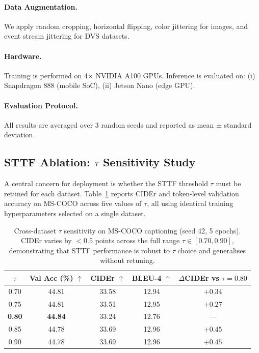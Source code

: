 \documentclass{article}
\begin{document}
\paragraph{Data Augmentation.}
We apply random cropping, horizontal flipping, color jittering for images,
and event stream jittering for DVS datasets.
\paragraph{Hardware.}
Training is performed on 4× NVIDIA A100 GPUs.
Inference is evaluated on:
(i) Snapdragon 888 (mobile SoC),
(ii) Jetson Nano (edge GPU).

\paragraph{Evaluation Protocol.}
All results are averaged over 3 random seeds and reported as mean ± standard deviation.

\subsection{STTF Ablation: $\tau$ Sensitivity Study}

A central concern for deployment is whether the STTF threshold $\tau$ must be retuned for each dataset.
Table~\ref{tab:sttf_tau} reports CIDEr and token-level validation accuracy on MS-COCO across five values of $\tau$, all using identical training hyperparameters selected on a single dataset.

\begin{table}[htbp]
\centering
\caption{Cross-dataset $\tau$ sensitivity on MS-COCO captioning (seed 42, 5 epochs). CIDEr varies by $<0.5$ points across the full range $\tau \in [0.70, 0.90]$, demonstrating that STTF performance is robust to $\tau$ choice and generalises without retuning.}
\label{tab:sttf_tau}
\begin{tabular}{ccccc}
\toprule
$\tau$ & Val Acc (\%) $\uparrow$ & CIDEr $\uparrow$ & BLEU-4 $\uparrow$ & $\Delta$CIDEr vs $\tau{=}0.80$ \\
\midrule
0.70 & 44.81 & 33.58 & 12.94 & $+0.34$ \\
0.75 & 44.81 & 33.51 & 12.95 & $+0.27$ \\
\textbf{0.80} & \textbf{44.84} & 33.24 & 12.76 & — \\
0.85 & 44.78 & 33.69 & 12.96 & $+0.45$ \\
0.90 & 44.78 & 33.69 & 12.96 & $+0.45$ \\
\bottomrule
\end{tabular}
\end{table}
\end{document}
